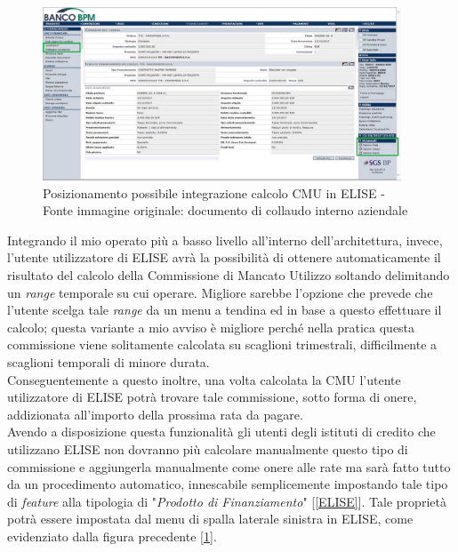 	\begin{figure}[H]
		\centering
	   	\includegraphics[width=0.95\textwidth]{immagini/Elise_postCMU}
	   	\caption{Posizionamento possibile integrazione calcolo CMU in ELISE -\\ Fonte immagine originale: documento di collaudo interno aziendale}
	\label{ImmagineEliseValutazioneProdotto}
	\end{figure}
	
	
	Integrando il mio operato più a basso livello all'interno dell'architettura, invece, l'utente utilizzatore di ELISE avrà la possibilità di ottenere automaticamente il risultato del calcolo della Commissione di Mancato Utilizzo soltando delimitando un \textit{range} temporale su cui operare. Migliore sarebbe l'opzione che prevede che l'utente scelga tale \textit{range} da un menu a tendina ed in base a questo effettuare il calcolo; questa variante a mio avviso è migliore perché nella pratica questa commissione viene solitamente calcolata su scaglioni trimestrali, difficilmente a scaglioni temporali di minore durata.\\
	
	Conseguentemente a questo inoltre, una volta calcolata la CMU l'utente utilizzatore di ELISE potrà trovare tale commissione, sotto forma di onere, addizionata all'importo della prossima rata da pagare.\\
	
	Avendo a disposizione questa funzionalità gli utenti degli istituti di credito che utilizzano ELISE non dovranno più calcolare manualmente questo tipo di commissione e aggiungerla manualmente come onere alle rate ma sarà fatto tutto da un procedimento automatico, innescabile semplicemente impostando tale tipo di \textit{feature} alla tipologia di "\textit{Prodotto di Finanziamento}" [\ref{ELISE}]. Tale proprietà potrà essere impostata dal menu di spalla laterale sinistra in ELISE, come evidenziato dalla figura precedente [\ref{ImmagineEliseValutazioneProdotto}].